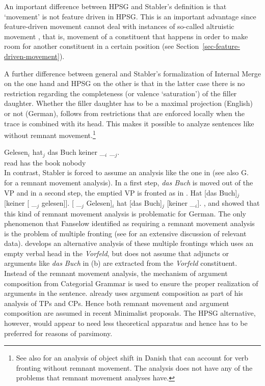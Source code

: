 An important difference between HPSG and Stabler's definition is that `movement' is not feature
driven in HPSG. This is an important advantage since feature-driven movement cannot deal with
instances of so-called altruistic movement \citep{Fanselow2003b}, that is, movement of a constituent that happens
in order to make room for another constituent in a certain position (see Section~\ref{sec-feature-driven-movement}).

A further difference between general \xbart and Stabler's formalization of Internal Merge on the
one hand and HPSG on the other is that in the latter case there is no restriction regarding the
completeness (or valence `saturation') of the filler daughter. Whether the filler daughter has to be
a maximal projection (English) or not (German), follows from restrictions that are enforced locally
when the trace is combined with its head. This makes it possible to analyze sentences like 
without remnant movement.\footnote{%
  See also  for an analysis of object shift in Danish that can account for verb
  fronting without remnant movement. The analysis does not have any of the problems that remnant
  movement analyses have.
}

\ea
\gll Gelesen$_i$ hat$_j$ das Buch keiner \_$_i$ \_$_j$.\\
     read        has     the book nobody\\
\z
In contrast, Stabler is forced to assume an analysis like the one in  (see also G.\
 for a remnant movement analysis). In a first step, \emph{das Buch} is moved out
of the VP \pmexa{1} and in a second step, the emptied VP is fronted as in \pmexb{1}.
\eal
\ex {}Hat [das Buch]$_j$ [keiner [ \_$_j$ gelesen]].
\ex {}[\sub{VP} \_$_j$ Gelesen]$_i$ hat [das Buch]$_j$ [keiner \_$_i$].
\zl
\citet[]{Haider93a}, %
\citet[Section~2]{dKM2001a} and \citet{Fanselow2002a} showed that this kind of remnant movement analysis is problematic for German. The
only phenomenon that Fanselow identified as requiring a remnant
movement analysis is the problem of multiple fronting
(see \citew{Mueller2003b} for an extensive discussion of relevant
data). \citet{Mueller2005c,Mueller2005d,MuellerGS} develops an alternative analysis of these multiple 
frontings which uses an empty verbal head in the \emph{Vorfeld}, but does not assume that
adjuncts or arguments like \emph{das Buch} in (\mex{0}b) are 
extracted from the \emph{Vorfeld} constituent. Instead of the remnant movement analysis, the
mechanism of argument composition from Categorial Grammar \citep{Geach70a,HN94a} is used to ensure the proper realization
of arguments in the sentence. \citet[\page 20]{Chomsky2007a} already uses argument composition as part of
his analysis of TPs and CPs. Hence both remnant movement and argument composition are assumed in
recent Minimalist proposals. The HPSG alternative, however,  would appear to need less theoretical
apparatus and hence has to be preferred for reasons of parsimony. 

